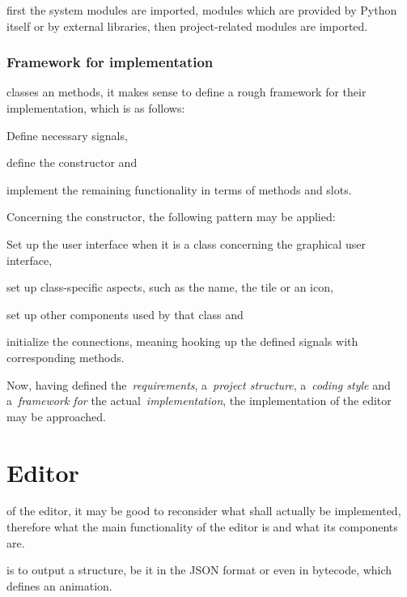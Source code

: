 \documentclass[%
    a4paper,    %
    justified,  %
    nobib,      %
    openany     %
]{tufte-book}
\begin{document}
 first the system modules
are imported, modules which are provided by Python itself or by external
libraries, then project-related modules are imported.

\subsection{Framework for implementation}
\label{appendix:subsec:framework}

 classes an methods, it makes
sense to define a rough framework for their implementation, which is as follows:
\begin{enumerate*}
  \item Define necessary signals,
  \item define the constructor and
  \item implement the remaining functionality in terms of methods and slots.
\end{enumerate*}
Concerning the constructor, the following pattern may be applied:
\begin{enumerate*}
  \item Set up the user interface when it is a class concerning the graphical
    user interface,
  \item set up class-specific aspects, such as the name, the tile or an icon,
  \item set up other components used by that class and
  \item initialize the connections, meaning hooking up the defined signals
    with corresponding methods.
\end{enumerate*}

Now, having defined the~\emph{requirements}, a~\emph{project structure},
a~\emph{coding style} and a~\emph{framework for} the
actual~\emph{implementation}, the implementation of the editor may be
approached.

\chapter{Editor}
\label{appendix:chap:editor}

 of the editor, it may
be good to reconsider what shall actually be implemented, therefore what the
main functionality of the editor is and what its components are.

 is to output a structure, be it in
the JSON format or even in bytecode, which defines an animation.
\end{document}
